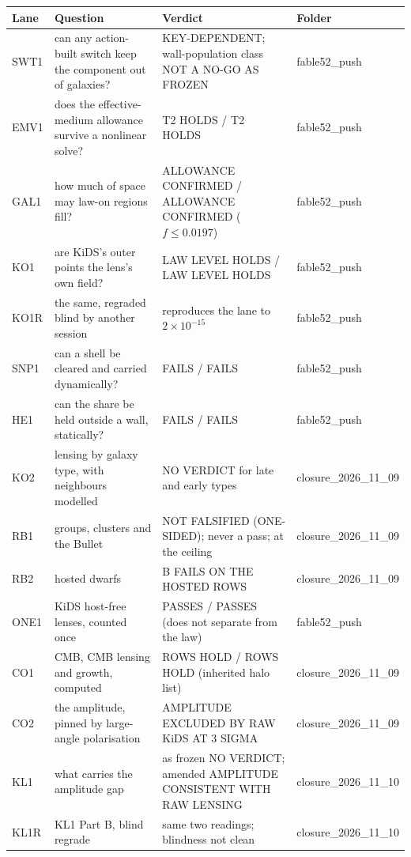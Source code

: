 \documentclass[10pt]{article}
\begin{document}
\begin{center}\small
\begin{longtable}{@{}p{1.3cm}p{5.0cm}p{5.4cm}p{2.4cm}@{}}\toprule
Lane & Question & Verdict & Folder\\\midrule\endhead
SWT1 & can any action-built switch keep the component out of galaxies? & KEY-DEPENDENT; wall-population class NOT A NO-GO AS FROZEN & fable52\_push\\\midrule
EMV1 & does the effective-medium allowance survive a nonlinear solve? & T2 HOLDS / T2 HOLDS & fable52\_push\\\midrule
GAL1 & how much of space may law-on regions fill? & ALLOWANCE CONFIRMED / ALLOWANCE CONFIRMED ($f\le0.0197$) & fable52\_push\\\midrule
KO1 & are KiDS's outer points the lens's own field? & LAW LEVEL HOLDS / LAW LEVEL HOLDS & fable52\_push\\\midrule
KO1R & the same, regraded blind by another session & reproduces the lane to $2\times10^{-15}$ & fable52\_push\\\midrule
SNP1 & can a shell be cleared and carried dynamically? & FAILS / FAILS & fable52\_push\\\midrule
HE1 & can the share be held outside a wall, statically? & FAILS / FAILS & fable52\_push\\\midrule
KO2 & lensing by galaxy type, with neighbours modelled & NO VERDICT for late and early types & closure\_2026\_11\_09\\\midrule
RB1 & groups, clusters and the Bullet & NOT FALSIFIED (ONE-SIDED); never a pass; at the ceiling & closure\_2026\_11\_09\\\midrule
RB2 & hosted dwarfs & B FAILS ON THE HOSTED ROWS & closure\_2026\_11\_09\\\midrule
ONE1 & KiDS host-free lenses, counted once & PASSES / PASSES (does not separate from the law) & fable52\_push\\\midrule
CO1 & CMB, CMB lensing and growth, computed & ROWS HOLD / ROWS HOLD (inherited halo list) & closure\_2026\_11\_09\\\midrule
CO2 & the amplitude, pinned by large-angle polarisation & AMPLITUDE EXCLUDED BY RAW KiDS AT 3 SIGMA & closure\_2026\_11\_09\\\midrule
KL1 & what carries the amplitude gap & as frozen NO VERDICT; amended AMPLITUDE CONSISTENT WITH RAW LENSING & closure\_2026\_11\_10\\\midrule
KL1R & KL1 Part B, blind regrade & same two readings; blindness not clean & closure\_2026\_11\_10\\\midrule

\end{longtable}
\end{center}
\end{document}
